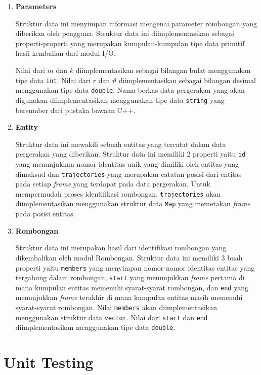 \begin{enumerate}
    \item \textbf{Parameters}
    
    Struktur data ini menyimpan informasi mengenai parameter rombongan yang diberikan oleh pengguna. Struktur data ini diimplementasikan sebagai properti-properti yang merupakan kumpulan-kumpulan tipe data primitif hasil kembalian dari modul I/O.
    
    Nilai dari $m$ dan $k$ diimplementasikan sebagai bilangan bulat menggunakan tipe data \texttt{int}. Nilai dari $r$ dan $\vartheta$ diimplementasikan sebagai bilangan desimal menggunakan tipe data \texttt{double}. Nama berkas data pergerakan yang akan digunakan diimplementasikan menggunakan tipe data \texttt{string} yang bersumber dari pustaka bawaan C++.
    
    \item \textbf{Entity}
    
    Struktur data ini mewakili sebuah entitas yang tercatat dalam data pergerakan yang diberikan. Struktur data ini memiliki 2 properti yaitu \texttt{id} yang menunjukkan nomor identitas unik yang dimiliki oleh entitas yang dimaksud dan \texttt{trajectories} yang merupakan catatan posisi dari entitas pada setiap \textit{frame} yang terdapat pada data pergerakan. Untuk mempermudah proses identifikasi rombongan, \texttt{trajectories} akan diimplementasikan menggunakan struktur data \texttt{Map} yang memetakan \textit{frame} pada posisi entitas.
    
    \item \textbf{Rombongan}
    
    Struktur data ini merupakan hasil dari identifikasi rombongan yang dikembalikan oleh modul Rombongan. Struktur data ini memiliki 3 buah properti yaitu \texttt{members} yang menyimpan nomor-nomor identitas entitas yang tergabung dalam rombongan, \texttt{start} yang menunjukkan \textit{frame} pertama di mana kumpulan entitas memenuhi syarat-syarat rombongan, dan \texttt{end} yang menunjukkan \textit{frame} terakhir di mana kumpulan entitas masih memenuhi syarat-syarat rombongan. Nilai \texttt{members} akan diimplementasikan menggunakan struktur data \texttt{vector}. Nilai dari \texttt{start} dan \texttt{end} diimplementasikan menggunakan tipe data \texttt{double}.
\end{enumerate}

\section{Unit Testing}
\label{sec:unit-test}

